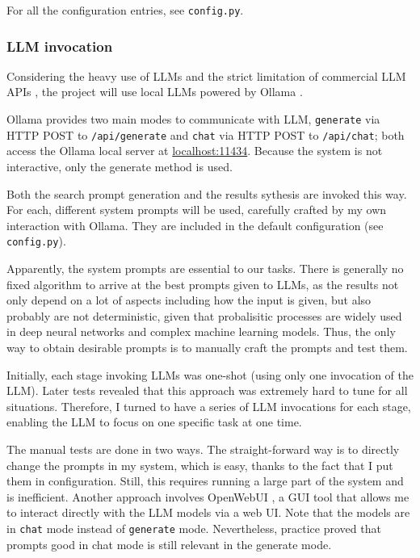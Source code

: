 \documentclass[final-report]{report-template}
\begin{document}
For all the configuration entries, see \texttt{config.py}.

\subsubsection{LLM invocation}
Considering the heavy use of LLMs and the strict limitation of commercial LLM
APIs \cite{openai.api.limit, anthropic.api.limit}, the project will use local
LLMs powered by Ollama \cite{ollama}.

Ollama provides two main modes to communicate with LLM, \texttt{generate} via
HTTP POST to \texttt{/api/generate} and \texttt{chat} via HTTP POST to
\texttt{/api/chat}; both access the Ollama local server at
\url{localhost:11434}. Because the system is not interactive, only the generate
method is used.

Both the search prompt generation and the results sythesis are invoked this
way. For each, different system prompts will be used, carefully
crafted by my own interaction with Ollama. They are included in the default
configuration (see \texttt{config.py}).

Apparently, the system prompts are essential to our tasks. There is
generally no fixed algorithm to arrive at the best prompts given to LLMs, as
the results not only depend on a lot of aspects including how the input is
given, but also probably are not deterministic, given that probalisitic
processes are widely used in deep neural networks and complex machine learning
models. Thus, the only way to obtain desirable prompts is to manually craft the
prompts and test them.

Initially, each stage invoking LLMs was one-shot (using only one invocation of
the LLM). Later tests revealed that this approach was extremely hard to tune
for all situations. Therefore, I turned to have a series of LLM invocations for
each stage, enabling the LLM to focus on one specific task at one time.

The manual tests are done in two ways. The straight-forward way is to directly
change the prompts in my system, which is easy, thanks to the fact that I
put them in configuration. Still, this requires running a large part of the
system and is inefficient. Another approach involves OpenWebUI
\cite{open.webui}, a GUI tool that allows me to interact directly with the LLM
models via a web UI. Note that the models are in \texttt{chat} mode instead of
\texttt{generate} mode. Nevertheless, practice proved that prompts good in chat
mode is still relevant in the generate mode.
\end{document}
